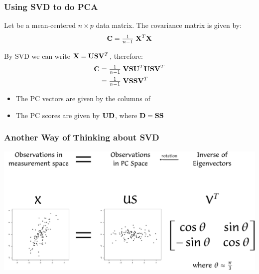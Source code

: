 \documentclass{beamer}
\begin{document}
\begin{frame}[fragile]
  \frametitle{Using SVD to do PCA}

Let  be a mean-centered $n \times p$ data matrix. The covariance matrix is given by:
\begin{align*}
  \mathbf{C} = \tfrac{1}{n-1} \; \mathbf{X}^T \mathbf{X}
\end{align*}

By SVD we can write $\mathbf{X} = \mathbf{U}\mathbf{S}\mathbf{V}^T$, therefore:
\begin{align*}
  \mathbf{C} &= \tfrac{1}{n-1} \; \mathbf{V}\mathbf{S}\mathbf{U}^T \mathbf{U}\mathbf{S}\mathbf{V}^T \\
          &= \tfrac{1}{n-1} \; \mathbf{V} \mathbf{S}\mathbf{S} \mathbf{V}^T
\end{align*}

\begin{itemize}
  \item The PC vectors are given by the columns of 
  \item The PC scores are given by $\mathbf{U}\mathbf{D}$, where $\mathbf{D} = \mathbf{S}\mathbf{S}$
\end{itemize}

\end{frame}




\begin{frame}
  \frametitle{Another Way of Thinking about SVD}


\begin{center}
\includegraphics[width=\textwidth]{fig-svdpca}
\end{center}

\end{frame}

\end{document}
